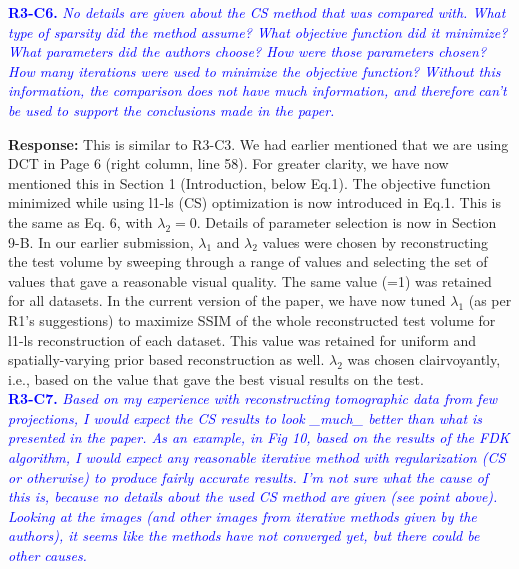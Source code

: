 \documentclass{article}
\begin{document}
\textcolor{blue}{\textbf{R3-C6.}\textit{ No details are given about the CS method that was compared with. What type of sparsity did the method assume? What objective function did it minimize? What parameters did the authors choose? How were those parameters chosen? How many iterations were used to minimize the objective function? Without this information, the comparison does not have much information, and therefore can't be used to support the conclusions made in the paper.}}

\textbf{Response:} This is similar to R3-C3. We had earlier mentioned that we are using DCT in Page 6 (right column, line 58). For greater clarity, we have now mentioned this in Section 1 (Introduction, below Eq.1).
The objective function minimized while using l1-ls (CS) optimization is now introduced in Eq.1. This is the same as Eq. 6,  with $\lambda_2 = 0$.
Details of parameter selection is now in Section 9-B.
In our earlier submission, $\lambda_1$ and $\lambda_2$ values were chosen by reconstructing the test volume by sweeping through a range of values and selecting the set of values that gave a reasonable visual quality. The same value (=1) was retained for all datasets. In the current version of the paper, we have now tuned $\lambda_1$ (as per R1's suggestions) to maximize SSIM of the whole reconstructed test volume for l1-ls reconstruction of each dataset. This value was retained for uniform and spatially-varying prior based reconstruction as well. $\lambda_2$ was chosen clairvoyantly,  i.e., based on the value that gave the best visual results on the test.\\

\textcolor{blue}{\textbf{R3-C7.}\textit{ Based on my experience with reconstructing tomographic data from few projections, I would expect the CS results to look \_much\_ better than what is presented in the paper. As an example, in Fig 10, based on the results of the FDK algorithm, I would expect any reasonable iterative method with regularization (CS or otherwise) to produce fairly accurate results. I'm not sure what the cause of this is, because no details about the used CS method are given (see point above). Looking at the images (and other images from iterative methods given by the authors), it seems like the methods have not converged yet, but there could be other causes.}}
\end{document}

